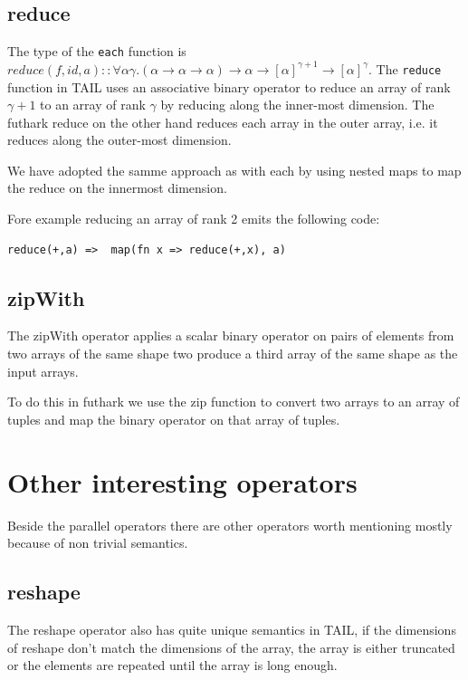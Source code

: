 \documentclass[11pt]{article}
\begin{document}
\subsection{reduce}
The type of the {\tt each} function is $reduce(f,id,a) :: \forall\alpha\gamma.(\alpha \to \alpha \to \alpha) \to \alpha \to [\alpha]^{\gamma+1} \to [\alpha]^\gamma$.
The {\tt reduce} function in TAIL uses an associative binary operator to reduce an array of rank $\gamma+1$ to an array of rank $\gamma$ by reducing along the inner-most dimension. The futhark reduce on the other hand reduces each array in the outer array, i.e. it reduces along the outer-most dimension. 

We have adopted the samme approach as with each by using nested maps to map the reduce on the innermost dimension.

Fore example reducing an array of rank 2 emits the following code:

\begin{lstlisting}[numbers=none,frame=none]
reduce(+,a)	=> 	map(fn x => reduce(+,x), a)
\end{lstlisting}

\subsection{zipWith}

The zipWith operator applies a scalar binary operator on pairs of elements from two arrays of the same shape two
produce a third array of the same shape as the input arrays.

 To do this in futhark we use the zip function to convert two arrays to an array of tuples and map the binary operator on that array of tuples.

\section{Other interesting operators}

Beside the parallel operators there are other operators worth mentioning mostly because of non trivial semantics.  

\subsection{reshape}

The reshape operator also has quite unique semantics in TAIL, if the dimensions of reshape don't match the dimensions of the array, the
array is either truncated or the elements are repeated until the array is long enough.
\end{document}
